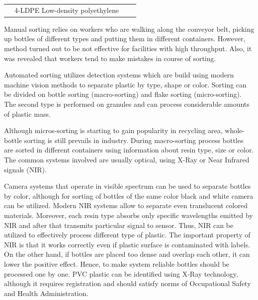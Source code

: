 \documentclass{lutmscthesis}[2010/09/22]
\begin{document}
\begin{table}[hpt]
\begin{center}
{\begin{tabular}{C{2cm} | l | C{2cm} | l}
& 4-LDPE Low-density polyethylene &
& \\

\end{tabular}}
\end{center}
\end{table}


Manual sorting relies on workers who are walking along the
conveyor belt, picking up bottles of different types and
putting them in different containers. However, method turned
out to be not effective for facilities with high throughput.
Also, it was revealed that workers tend to make mistakes
in course of sorting.

Automated sorting utilizes detection systems which are build
using modern machine vision methods to separate plastic by type,
shape or color. Sorting can be divided on bottle sorting (macro-sorting)
and flake sorting (micro-sorting). The second type is performed on granules
and can process considerable amounts of plastic mass.

Although micros-sorting is starting to gain
popularity in recycling area, whole-bottle sorting
is still prevails in industry. During macro-sorting
process bottles are sorted in different containers
using information about resin type, size or color.
The common systems involved are usually optical, using
X-Ray or Near Infrared signals (NIR).

Camera systems that operate in visible spectrum
can be used to separate bottles by color, although for
sorting of bottles of the same color black and white
camera can be utilized. Modern NIR systems
allow to separate even translucent colored materials.
Moreover, each resin type absorbs only specific wavelengths
emitted by NIR and after that transmits particular signal
to sensor. Thus, NIR can be utilized to effectively
process different type of plastic. The important property
of NIR is that it works correctly even if plastic surface
is contaminated with labels. On the other hand, if bottles
are placed too dense and overlap each other, it can lower
the positive effect. Hence, to make system reliable
bottles should be processed one by one. PVC plastic can
be identified using X-Ray technology, although it requires
registration and should satisfy norms of Occupational Safety
and Health Administration.
\end{document}
